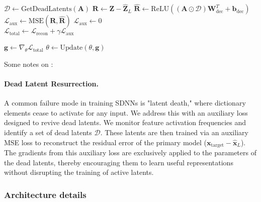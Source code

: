 \begin{algorithm}[h!]
\begin{algorithmic}[1]
    \Statex {}
    \State $\mathcal{D} \gets \text{GetDeadLatents}(\mathbf{A})$
     
        \State $\mathbf{R} \gets \mathbf{Z} - \hat{\mathbf{Z}}_L$ 
        \State $\hat{\mathbf{R}} \gets \text{ReLU}((\mathbf{A} \odot \mathcal{D}) \mathbf{W}_{\text{dec}}^T + \mathbf{b}_{\text{dec}})$ 
        \State $\mathcal{L}_{\text{aux}} \gets \text{MSE}(\mathbf{R}, \hat{\mathbf{R}})$ 
    \Else
        \State $\mathcal{L}_{\text{aux}} \gets 0$
    \EndIf
    \\
    \State $\mathcal{L}_{\text{total}} \gets \mathcal{L}_{\text{recon}} + \gamma \mathcal{L}_{\text{aux}}$ 

    \Statex {}
    \State $\mathbf{g} \gets \nabla_{\theta} \mathcal{L}_{\text{total}}$ 
    \State $\theta \gets \text{Update}(\theta, \mathbf{g})$ 
\EndProcedure
\end{algorithmic}
\end{algorithm}

Some notes on :

\paragraph{Dead Latent Resurrection.}
A common failure mode in training SDNNs is "latent death," where dictionary elements cease to activate for any input. We address this with an auxiliary loss designed to revive dead latents. We monitor feature activation frequencies and identify a set of dead latents $\mathcal{D}$. These latents are then trained via an auxiliary MSE loss to reconstruct the residual error of the primary model ($\mathbf{x}_{\text{target}} - \hat{\mathbf{x}}_L$). The gradients from this auxiliary loss are exclusively applied to the parameters of the dead latents, thereby encouraging them to learn useful representations without disrupting the training of active latents.

\subsubsection{Architecture details}
\label{subsubsection:architecture_details}


